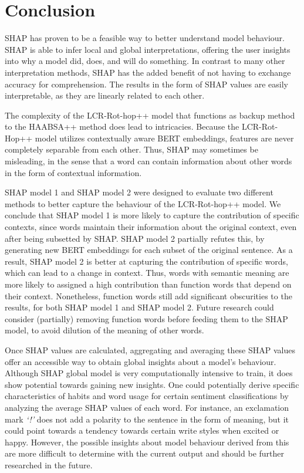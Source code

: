 \chapter{Conclusion}
    \label{chap:conclusion}
SHAP has proven to be a feasible way to better understand model behaviour. SHAP is able to infer local and global interpretations, offering the user insights into why a model did, does, and will do something. In contrast to many other interpretation methods, SHAP has the added benefit of not having to exchange accuracy for comprehension. The results in the form of SHAP values are easily interpretable, as they are linearly related to each other.

The complexity of the LCR-Rot-hop++ model that functions as backup method to the HAABSA++ method does lead to intricacies. Because the LCR-Rot-Hop++ model utilizes contextually aware BERT embeddings, features are never completely separable from each other. Thus, SHAP may sometimes be misleading, in the sense that a word can contain information about other words in the form of contextual information. 

SHAP model 1 and SHAP model 2 were designed to evaluate two different methods to better capture the behaviour of the LCR-Rot-hop++ model. We conclude that SHAP model 1 is more likely to capture the contribution of specific contexts, since words maintain their information about the original context, even after being subsetted by SHAP. SHAP model 2 partially refutes this, by generating new BERT embeddings for each subset of the original sentence. As a result, SHAP model 2 is better at capturing the contribution of specific words, which can lead to a change in context. Thus, words with semantic meaning are more likely to assigned a high contribution than function words that depend on their context. Nonetheless, function words still add significant obscurities to the results, for both SHAP model 1 and SHAP model 2. Future research could consider (partially) removing function words before feeding them to the SHAP model, to avoid dilution of the meaning of other words. 

Once SHAP values are calculated, aggregating and averaging these SHAP values offer an accessible way to obtain global insights about a model's behaviour. Although SHAP global model is very computationally intensive to train, it does show potential towards gaining new insights. One could potentially derive specific characteristics of habits and word usage for certain sentiment classifications by analyzing the average SHAP values of each word. For instance, an exclamation mark \textit{`!'} does not add a polarity to the sentence in the form of meaning, but it could point towards a tendency towards certain write styles when excited or happy. However, the possible insights about model behaviour derived from this are more difficult to determine with the current output and should be further researched in the future. 

